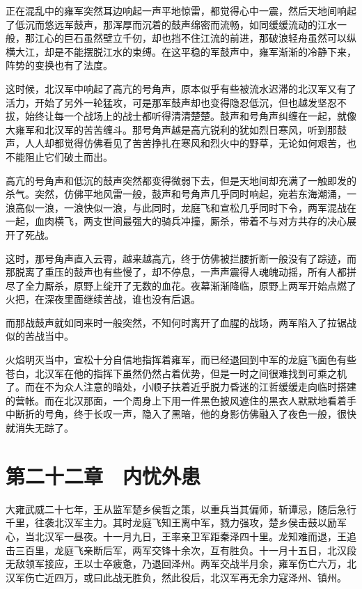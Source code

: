 正在混乱中的雍军突然耳边响起一声平地惊雷，都觉得心中一震，然后天地间响起了低沉而悠远军鼓声，那浑厚而沉着的鼓声绵密而流畅，如同缓缓流动的江水一般，那江心的巨石虽然壁立千仞，却也挡不住江流的前进，那破浪轻舟虽然可以纵横大江，却是不能摆脱江水的束缚。在这平稳的军鼓声中，雍军渐渐的冷静下来，阵势的变换也有了法度。

这时候，北汉军中响起了高亢的号角声，原本似乎有些被流水迟滞的北汉军又有了活力，开始了另外一轮猛攻，可是那军鼓声却也变得隐忍低沉，但也越发坚忍不拔，始终让每一个战场上的战士都听得清清楚楚。鼓声和号角声纠缠在一起，就像大雍军和北汉军的苦苦缠斗。那号角声越是高亢锐利的犹如烈日寒风，听到那鼓声，人人却都觉得仿佛看见了苦苦挣扎在寒风和烈火中的野草，无论如何艰苦，也不能阻止它们破土而出。

高亢的号角声和低沉的鼓声突然都变得微弱下去，但是天地间却充满了一触即发的杀气。突然，仿佛平地风雷一般，鼓声和号角声几乎同时响起，宛若东海潮涌，一浪高似一浪，一浪快似一浪，与此同时，龙庭飞和宣松几乎同时下令，两军混战在一起，血肉横飞，两支世间最强大的骑兵冲撞，厮杀，带着不与对方共存的决心展开了死战。

这时，那号角声直入云霄，越来越高亢，终于仿佛被拦腰折断一般没有了踪迹，而那脱离了重压的鼓声也有些慢了，却不停息，一声声震得人魂魄动摇，所有人都拼尽了全力厮杀，原野上绽开了无数的血花。夜幕渐渐降临，原野上两军开始点燃了火把，在深夜里面继续苦战，谁也没有后退。

而那战鼓声就如同来时一般突然，不知何时离开了血腥的战场，两军陷入了拉锯战似的苦战当中。

火焰明灭当中，宣松十分自信地指挥着雍军，而已经退回到中军的龙庭飞面色有些苍白，北汉军在他的指挥下虽然仍然占着优势，但是一时之间很难找到可乘之机了。而在不为众人注意的暗处，小顺子扶着近乎脱力昏迷的江哲缓缓走向临时搭建的营帐。而在北汉那面，一个周身上下用一件黑色披风遮住的黑衣人默默地看着手中断折的号角，终于长叹一声，隐入了黑暗，他的身影仿佛融入了夜色一般，很快就消失无踪了。

\chapter{第二十二章　内忧外患}

大雍武威二十七年，王从监军楚乡侯哲之策，以重兵当其偏师，斩谭忌，随后急行千里，往袭北汉军主力。其时龙庭飞知王离中军，戮力强攻，楚乡侯击鼓以励军心，当北汉军一昼夜。十一月九日，王率亲卫军距秦泽四十里。龙知难而退，王追击三百里，龙庭飞亲断后军，两军交锋十余次，互有胜负。十一月十五日，北汉段无敌领军接应，王以士卒疲惫，乃退回泽州。两军交战半月余，雍军伤亡六万，北汉军伤亡近四万，或曰此战无胜负，然此役后，北汉军再无余力寇泽州、镇州。

